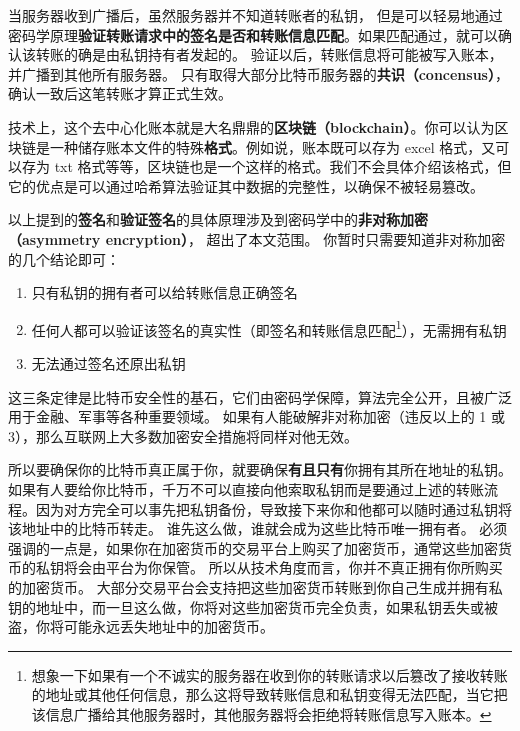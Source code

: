 当服务器收到广播后，虽然服务器并不知道转账者的私钥， 但是可以轻易地通过密码学原理\textbf{验证转账请求中的签名是否和转账信息匹配}。如果匹配通过，就可以确认该转账的确是由私钥持有者发起的。 验证以后，转账信息将可能被写入账本，并广播到其他所有服务器。 只有取得大部分比特币服务器的\textbf{共识（concensus）}， 确认一致后这笔转账才算正式生效。

技术上，这个去中心化账本就是大名鼎鼎的\textbf{区块链（blockchain）}。你可以认为区块链是一种储存账本文件的特殊\textbf{格式}。例如说，账本既可以存为 excel 格式，又可以存为 txt 格式等等，区块链也是一个这样的格式。我们不会具体介绍该格式，但它的优点是可以通过哈希算法验证其中数据的完整性，以确保不被轻易篡改。

以上提到的\textbf{签名}和\textbf{验证签名}的具体原理涉及到密码学中的\textbf{非对称加密（asymmetry encryption）}， 超出了本文范围。 你暂时只需要知道非对称加密的几个结论即可：
\begin{enumerate}
\item 只有私钥的拥有者可以给转账信息正确签名
\item 任何人都可以验证该签名的真实性（即签名和转账信息匹配\footnote{想象一下如果有一个不诚实的服务器在收到你的转账请求以后篡改了接收转账的地址或其他任何信息，那么这将导致转账信息和私钥变得无法匹配，当它把该信息广播给其他服务器时，其他服务器将会拒绝将转账信息写入账本。}），无需拥有私钥
\item 无法通过签名还原出私钥
\end{enumerate}
这三条定律是比特币安全性的基石，它们由密码学保障，算法完全公开，且被广泛用于金融、军事等各种重要领域。 如果有人能破解非对称加密（违反以上的 1 或 3），那么互联网上大多数加密安全措施将同样对他无效。

所以要确保你的比特币真正属于你，就要确保\textbf{有且只有}你拥有其所在地址的私钥。 如果有人要给你比特币，千万不可以直接向他索取私钥而是要通过上述的转账流程。因为对方完全可以事先把私钥备份，导致接下来你和他都可以随时通过私钥将该地址中的比特币转走。 谁先这么做，谁就会成为这些比特币唯一拥有者。 必须强调的一点是，如果你在加密货币的交易平台上购买了加密货币，通常这些加密货币的私钥将会由平台为你保管。 所以从技术角度而言，你并不真正拥有你所购买的加密货币。 大部分交易平台会支持把这些加密货币转账到你自己生成并拥有私钥的地址中，而一旦这么做，你将对这些加密货币完全负责，如果私钥丢失或被盗，你将可能永远丢失地址中的加密货币。


